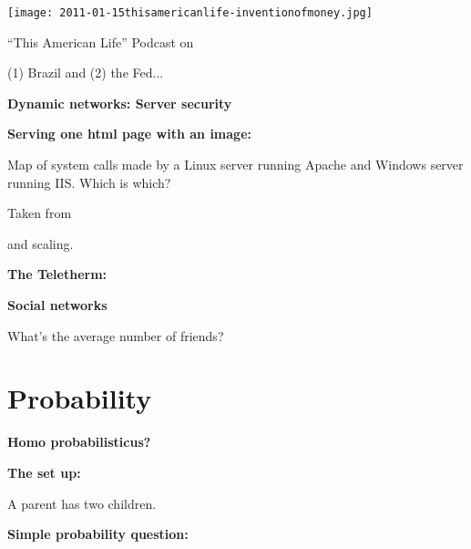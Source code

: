       
    \texttt{[image: 2011-01-15thisamericanlife-inventionofmoney.jpg]}
    
    
     
      ``This American Life''
      Podcast on 
     
      (1) Brazil and (2) the Fed...
    
  


  \textbf{Dynamic networks: Server security}

  \textbf{Serving one html page with an image:}
    \bigskip
    \setlength\fboxsep{0pt}
    \setlength\fboxrule{1pt}
    
     
      Map of system calls made by a Linux server running Apache and
      Windows server running IIS.  Which is which?
    
  
  {\tiny
  Taken from }
  

  
  
  and scaling.

  \cite{hill2008a}



  \textbf{The Teletherm:}
  




  \textbf{Social networks}

  What's the average number of friends?


\section{Probability}

\textbf{Homo probabilisticus?}

\textbf{The set up:}
  
  
    A parent has two children.
  


\textbf{Simple probability question:}
  
  
  
